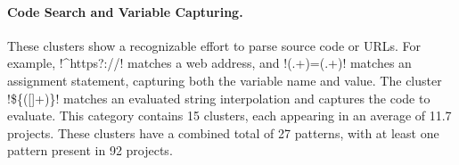 \paragraph{Code Search and Variable Capturing.}
\label{cluster:search}
These clusters show a recognizable effort to parse source code or URLs. For example,
\cverb!^https?://! matches a web address, and \cverb!(.+)=(.+)! matches an assignment statement, capturing both the variable name and value.
The cluster  \cverb!\$\{([\w\-]+)\}! matches an evaluated string interpolation and captures the code to evaluate.
This category contains 15 clusters, each appearing in an average of 11.7 projects.
These clusters have a combined total of 27 patterns, with at least one pattern present in 92 projects.
